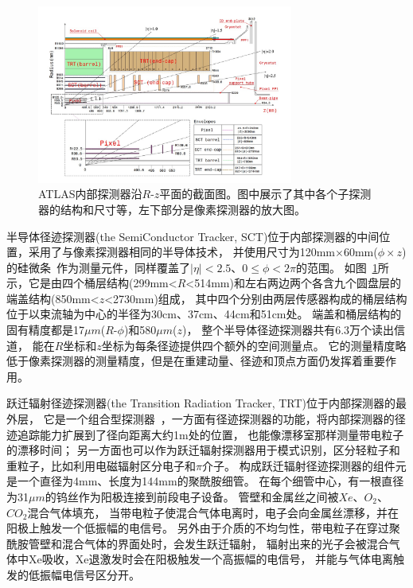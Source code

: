 \begin{figure}
  \begin{center}
    \includegraphics[width=0.75\textwidth]{figuresEXP/ATLAS9.jpg}
  \end{center}
  \caption{
ATLAS内部探测器沿$R$-$z$平面的截面图。图中展示了其中各个子探测器的结构和尺寸等，左下部分是像素探测器的放大图。
  }
    \label{fig:ATLAS9}
\end{figure}

半导体径迹探测器(the SemiConductor Tracker, SCT)位于内部探测器的中间位置，采用了与像素探测器相同的半导体技术，
并使用尺寸为120mm$\times$60mm($\phi\times z$)的硅微条~\cite{SCTSS}作为测量元件，同样覆盖了$|\eta|<2.5$、$0\le\phi<2\pi$的范围。
如图~\ref{fig:ATLAS9}所示，它是由四个桶层结构(299mm<$R$<514mm)和左右两边两个各含九个圆盘层的端盖结构(850mm<$z$<2730mm)组成，
其中四个分别由两层传感器构成的桶层结构位于以束流轴为中心的半径为30cm、37cm、44cm和51cm处。
端盖和桶层结构的固有精度都是17$\mu m$($R$-$\phi$)和580$\mu m$($z$)，
整个半导体径迹探测器共有6.3万个读出信道，
能在$R$坐标和$z$坐标为每条径迹提供四个额外的空间测量点。
它的测量精度略低于像素探测器的测量精度，但是在重建动量、径迹和顶点方面仍发挥着重要作用。

跃迁辐射径迹探测器(the Transition Radiation Tracker, TRT)位于内部探测器的最外层，
它是一个组合型探测器~\cite{ATLASTRT}，一方面有径迹探测器的功能，将内部探测器的径迹追踪能力扩展到了径向距离大约1m处的位置，
也能像漂移室那样测量带电粒子的漂移时间；
另一方面也可以作为跃迁辐射探测器用于模式识别，区分轻粒子和重粒子，比如利用电磁辐射区分电子和$\pi$介子。
构成跃迁辐射径迹探测器的组件元是一个直径为4mm、长度为144mm的聚酰胺细管。
在每个细管中心，有一根直径为31$\mu m$的钨丝作为阳极连接到前段电子设备。
管壁和金属丝之间被$Xe$、$O_2$、$CO_2$混合气体填充，
当带电粒子使混合气体电离时，电子会向金属丝漂移，并在阳极上触发一个低振幅的电信号。
另外由于介质的不均匀性，带电粒子在穿过聚酰胺管壁和混合气体的界面处时，会发生跃迁辐射，
辐射出来的光子会被混合气体中Xe吸收，Xe退激发时会在阳极触发一个高振幅的电信号，
并能与气体电离触发的低振幅电信号区分开。


